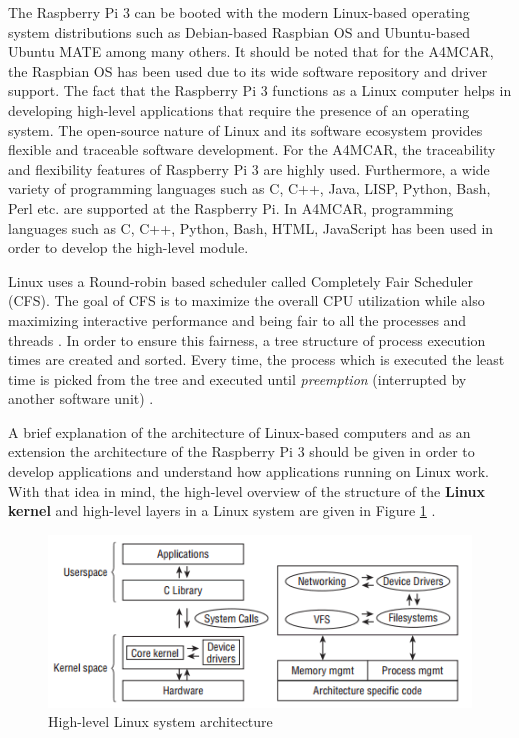 The Raspberry Pi 3 can be booted with the modern Linux-based operating system distributions such as Debian-based Raspbian OS \cite{raspbiandownload} and Ubuntu-based Ubuntu MATE\cite{ubuntumatedownload} among many others\cite{raspberrypiinfo}. It should be noted that for the A4MCAR, the Raspbian OS has been used due to its wide software repository and driver support. The fact that the Raspberry Pi 3 functions as a Linux computer helps in developing high-level applications that require the presence of an operating system. The open-source nature of Linux and its software ecosystem provides flexible and traceable software development. For the A4MCAR, the traceability and flexibility features of Raspberry Pi 3 are highly used. Furthermore, a wide variety of programming languages such as C, C++, Java, LISP, Python, Bash, Perl etc. are supported at the Raspberry Pi. In A4MCAR, programming languages such as C, C++, Python, Bash, HTML, JavaScript has been used in order to develop the high-level module.

Linux uses a Round-robin based scheduler called Completely Fair Scheduler (CFS). The goal of CFS is to maximize the overall CPU utilization while also maximizing interactive performance and being fair to all the processes and threads \cite{cfs}. In order to ensure this fairness, a tree structure of process execution times are created and sorted. Every time, the process which is executed the least time is picked from the tree and executed until \textit{preemption} (interrupted by another software unit) \cite{cfs}.

A brief explanation of the architecture of Linux-based computers and as an extension the architecture of the Raspberry Pi 3 should be given in order to develop applications and understand how applications running on Linux work. With that idea in mind, the high-level overview of the structure of  the \textbf{Linux kernel} and high-level layers in a Linux system are given in Figure \ref{fig:linuxarchitecture} \cite{linuxkernelbook}.
\begin{figure}[!ht]
	\centering
	\captionsetup{justification=centering}
	\includegraphics[scale=0.9]{content/images/linuxarchitecture.png}
	\caption{High-level Linux system architecture \cite{linuxkernelbook}}
	\label{fig:linuxarchitecture}
\end{figure}

